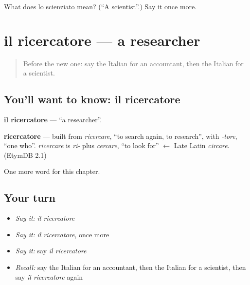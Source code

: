 \begin{tcolorbox}[breakable,colback=teal!4,colframe=teal!35!black,title={Before you move on}]
What does lo scienziato mean? (\textquotedblleft{}A scientist\textquotedblright{}.) Say it once more.
\end{tcolorbox}
\section[il ricercatore]{il ricercatore — a researcher}

\label{lesson:IT-C195-ricercatore}



\begin{quote}
Before the new one: say the Italian for an accountant, then the Italian for a scientist.
\end{quote}

\subsection*{You'll want to know: il ricercatore}
\textbf{il ricercatore} — \textquotedblleft{}a researcher\textquotedblright{}.

\begin{cousinweb}
\textbf{ricercatore} — built from \emph{ricercare}, \textquotedblleft{}to search again, to research\textquotedblright{}, with \emph{-tore}, \textquotedblleft{}one who\textquotedblright{}. \emph{ricercare} is \emph{ri-} plus \emph{cercare}, \textquotedblleft{}to look for\textquotedblright{} $\leftarrow$ Late Latin \emph{circare}. (EtymDB 2.1)
\end{cousinweb}

\begin{grammarlens}[title={What you've built}]
One more word for this chapter.
\end{grammarlens}

\subsection*{Your turn}
\begin{itemize}
\raggedright
  \item \emph{Say it:} \emph{il ricercatore}
  \item \emph{Say it:} \emph{il ricercatore}, once more
  \item \emph{Say it:} say \emph{il ricercatore}
  \item \emph{Recall:} say the Italian for an accountant, then the Italian for a scientist, then say \emph{il ricercatore} again
\end{itemize}

